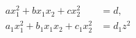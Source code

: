 \begin{proposition}
\[
    \begin{aligned}ax_1^2+bx_1x_2+cx_2^2&=d,\\a_1x_1^2+b_1x_1x_2+c_1x_2^2&=d_1z^2\end{aligned}
\]
\end{proposition}
